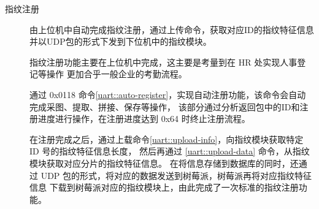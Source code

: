     \begin{description}
        \item[指纹注册] 由上位机中自动完成指纹注册，通过上传命令，获取对应ID的指纹特征信息并以UDP包的形式下发到下位机中的指纹模块。
        
        指纹注册功能主要在上位机中完成，这主要是考量到在 HR 处实现人事登记等操作
        更加合乎一般企业的考勤流程。
        
        通过 0x0118 命令\ref{uart::auto-register}，实现自动注册功能，该命令会自动完成采图、提取、拼接、保存等操作，
        该部分通过分析返回包中的ID和注册进度进行操作，在注册进度达到 0x64 时终止注册流程。

        \begin{table}[htbp]
            \caption{自动注册命令用户层帧} \label{uart::auto-register}
        \end{table}

        在注册完成之后，通过上载命令\ref{uart::upload-info}，向指纹模块获取特定 ID 号的指纹特征信息长度，
        然后再通过 \ref{uart::upload-data} 命令，从指纹模块获取对应分片的指纹特征信息。
        在将信息存储到数据库的同时，还通过 UDP 包的形式，将对应的数据发送到树莓派，树莓派再将对应指纹特征信息
        下载到树莓派对应的指纹模块上，由此完成了一次标准的指纹注册功能。

        \begin{table}[htbp]
             \caption{获取上传信息命令用户层帧} \label{uart::upload-info}
        \end{table}


\end{description}
